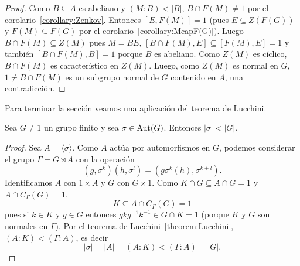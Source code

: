 \begin{proof}
	\medskip
	Como $B\subseteq A$ es abeliano y $(M:B)<|B|$, $B\cap F(M)\ne1$ por el
	corolario~\ref{corollary:Zenkov}. Entonces $[E,F(M)]=1$ (pues $E\subseteq
	Z(F(G))$ y $F(M)\subseteq F(G)$ por el corolario~\ref{corollary:McapF(G)}).
	Luego $B\cap F(M)\subseteq Z(M)$ pues $M=BE$, $[B\cap F(M),E]\subseteq
	[F(M),E]=1$ y también $[B\cap F(M),B]=1$ porque $B$ es abeliano. Como
	$Z(M)$ es cíclico, $B\cap F(M)$ es característico en $Z(M)$. Luego, como
	$Z(M)$ es normal en $G$, $1\ne B\cap F(M)$ es un subgrupo normal de $G$
	contenido en $A$, una contradicción.
\end{proof}

Para terminar la sección veamos una aplicación del teorema de Lucchini.

\begin{corollary}[Horosevskii]
	Sea $G\ne1$ un grupo finito y sea $\sigma\in\operatorname{Aut}(G)$. Entonces
	$|\sigma|<|G|$.
\end{corollary}

\begin{proof}
	Sea $A=\langle\sigma\rangle$. Como $A$ actúa por automorfismos en $G$,
	podemos considerar el grupo $\Gamma=G\rtimes A$ con la operación 
	\[
	(g,\sigma^k)(h,\sigma^l)=(g\sigma^k(h),\sigma^{k+l}).
	\]
	Identificamos $A$ con $1\times A$ y $G$ con $G\times 1$. 
	Como $K\cap G\subseteq A\cap G=1$ y $A\cap C_{\Gamma}(G)=1$, 
	\[
		K\subseteq A\cap C_{\Gamma}(G)=1
	\]
	pues si $k\in K$ y $g\in G$ entonces $gkg^{-1}k^{-1}\in G\cap K=1$ (porque
	$K$ y $G$ son normales en $\Gamma$).  Por el teorema de
	Lucchini~\ref{theorem:Lucchini}, $(A:K)<(\Gamma:A)$, es decir
	\[
		|\sigma|=|A|=(A:K)<(\Gamma:A)=|G|.
	\]
\end{proof}
